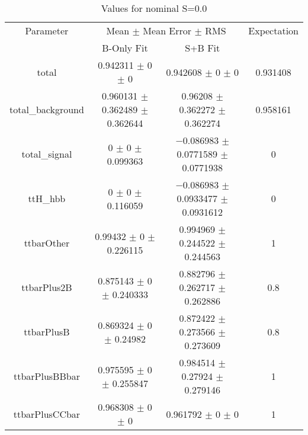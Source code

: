 \begin{table}
\centering
\caption{Values for nominal S=0.0}
\begin{tabular}{cccc}
\toprule
Parameter & \multicolumn{2}{c}{Mean $\pm$ Mean Error $\pm$ RMS} & Expectation\\
 & B-Only Fit & S+B Fit & \\
\midrule
total & \num{0.942311} $\pm$ \num{0} $\pm$ \num{0} & \num{0.942608} $\pm$ \num{0} $\pm$ \num{0} & \num{0.931408}\\
total\_background & \num{0.960131} $\pm$ \num{0.362489} $\pm$ \num{0.362644} & \num{0.96208} $\pm$ \num{0.362272} $\pm$ \num{0.362274} & \num{0.958161}\\
total\_signal & \num{0} $\pm$ \num{0} $\pm$ \num{0.099363} & \num{-0.086983} $\pm$ \num{0.0771589} $\pm$ \num{0.0771938} & \num{0}\\
ttH\_hbb & \num{0} $\pm$ \num{0} $\pm$ \num{0.116059} & \num{-0.086983} $\pm$ \num{0.0933477} $\pm$ \num{0.0931612} & \num{0}\\
ttbarOther & \num{0.99432} $\pm$ \num{0} $\pm$ \num{0.226115} & \num{0.994969} $\pm$ \num{0.244522} $\pm$ \num{0.244563} & \num{1}\\
ttbarPlus2B & \num{0.875143} $\pm$ \num{0} $\pm$ \num{0.240333} & \num{0.882796} $\pm$ \num{0.262717} $\pm$ \num{0.262886} & \num{0.8}\\
ttbarPlusB & \num{0.869324} $\pm$ \num{0} $\pm$ \num{0.24982} & \num{0.872422} $\pm$ \num{0.273566} $\pm$ \num{0.273609} & \num{0.8}\\
ttbarPlusBBbar & \num{0.975595} $\pm$ \num{0} $\pm$ \num{0.255847} & \num{0.984514} $\pm$ \num{0.27924} $\pm$ \num{0.279146} & \num{1}\\
ttbarPlusCCbar & \num{0.968308} $\pm$ \num{0} $\pm$ \num{0} & \num{0.961792} $\pm$ \num{0} $\pm$ \num{0} & \num{1}\\
\bottomrule
\end{tabular}
\end{table}